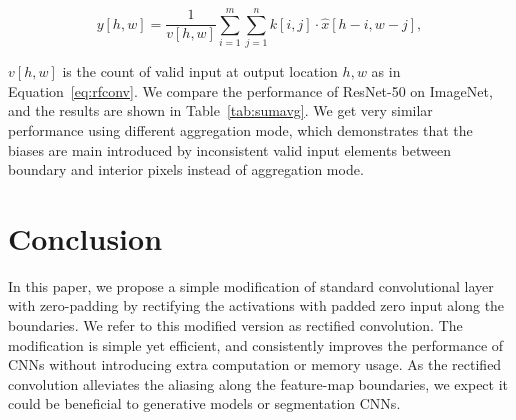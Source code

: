 \documentclass{article}
\begin{document}
\begin{equation}
    y[h, w]=\frac{1}{v[h, w]}\sum_{i=1}^m\sum_{j=1}^n k[i, j] \cdot \hat{x}[h-i, w-j] ,
\label{eq:rfconv2}
\end{equation}



$v[h,w]$ is the count of valid input at output location $h, w$ as in Equation~\ref{eq:rfconv}. We compare the performance of ResNet-50 on ImageNet, and the results are shown in Table~\ref{tab:sumavg}. We get very similar performance using different aggregation mode, which demonstrates that the biases are main introduced by inconsistent valid input elements between boundary and interior pixels instead of aggregation mode. 


%

\section{Conclusion}
In this paper, we propose a simple modification of standard convolutional layer with zero-padding by rectifying the activations with padded zero input along the boundaries. We refer to this modified version as rectified convolution. 
The modification is simple yet efficient, and consistently improves the performance of CNNs without introducing extra computation or memory usage. 
As the rectified convolution alleviates the aliasing along the feature-map boundaries, we expect it could be beneficial to generative models or segmentation CNNs. 



\end{document}
